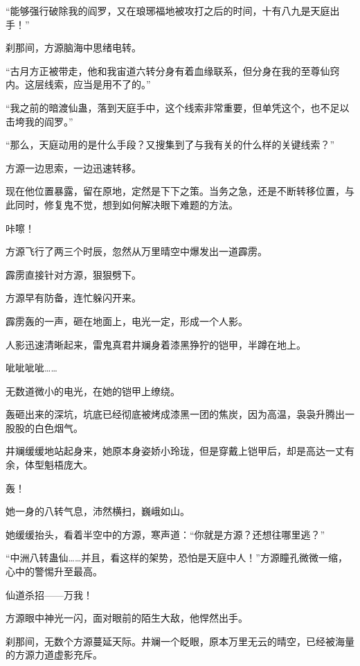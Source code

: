 
\begin{this_body}

“能够强行破除我的阎罗，又在琅琊福地被攻打之后的时间，十有八九是天庭出手！”

刹那间，方源脑海中思绪电转。

“古月方正被带走，他和我宙道六转分身有着血缘联系，但分身在我的至尊仙窍内。这层线索，应当是用不了的。”

“我之前的暗渡仙蛊，落到天庭手中，这个线索非常重要，但单凭这个，也不足以击垮我的阎罗。”

“那么，天庭动用的是什么手段？又搜集到了与我有关的什么样的关键线索？”

方源一边思索，一边迅速转移。

现在他位置暴露，留在原地，定然是下下之策。当务之急，还是不断转移位置，与此同时，修复鬼不觉，想到如何解决眼下难题的方法。

咔嚓！

方源飞行了两三个时辰，忽然从万里晴空中爆发出一道霹雳。

霹雳直接针对方源，狠狠劈下。

方源早有防备，连忙躲闪开来。

霹雳轰的一声，砸在地面上，电光一定，形成一个人影。

人影迅速清晰起来，雷鬼真君井斓身着漆黑狰狞的铠甲，半蹲在地上。

呲呲呲呲……

无数道微小的电光，在她的铠甲上缭绕。

轰砸出来的深坑，坑底已经彻底被烤成漆黑一团的焦炭，因为高温，袅袅升腾出一股股的白色烟气。

井斓缓缓地站起身来，她原本身姿娇小玲珑，但是穿戴上铠甲后，却是高达一丈有余，体型魁梧庞大。

轰！

她一身的八转气息，沛然横扫，巍峨如山。

她缓缓抬头，看着半空中的方源，寒声道：“你就是方源？还想往哪里逃？”

“中洲八转蛊仙……并且，看这样的架势，恐怕是天庭中人！”方源瞳孔微微一缩，心中的警惕升至最高。

仙道杀招——万我！

方源眼中神光一闪，面对眼前的陌生大敌，他悍然出手。

刹那间，无数个方源蔓延天际。井斓一个眨眼，原本万里无云的晴空，已经被海量的方源力道虚影充斥。


\end{this_body}
